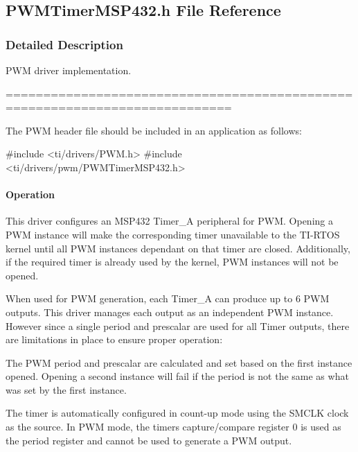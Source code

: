 \subsection{P\+W\+M\+Timer\+M\+S\+P432.\+h File Reference}
\label{_p_w_m_timer_m_s_p432_8h}


\subsubsection{Detailed Description}
P\+W\+M driver implementation. 

============================================================================

The P\+W\+M header file should be included in an application as follows\+: 
\begin{DoxyCode}
\textcolor{preprocessor}{#include <ti/drivers/PWM.h>}
\textcolor{preprocessor}{#include <ti/drivers/pwm/PWMTimerMSP432.h>}
\end{DoxyCode}


\paragraph*{Operation}

This driver configures an M\+S\+P432 Timer\+\_\+\+A peripheral for P\+W\+M. Opening a P\+W\+M instance will make the corresponding timer unavailable to the T\+I-\/\+R\+T\+O\+S kernel until all P\+W\+M instances dependant on that timer are closed. Additionally, if the required timer is already used by the kernel, P\+W\+M instances will not be opened.

When used for P\+W\+M generation, each Timer\+\_\+\+A can produce up to 6 P\+W\+M outputs. This driver manages each output as an independent P\+W\+M instance. However since a single period and prescalar are used for all Timer outputs, there are limitations in place to ensure proper operation\+:
\begin{DoxyEnumerate}
\item The P\+W\+M period and prescalar are calculated and set based on the first instance opened. Opening a second instance will fail if the period is not the same as what was set by the first instance.
\end{DoxyEnumerate}

The timer is automatically configured in count-\/up mode using the S\+M\+C\+L\+K clock as the source. In P\+W\+M mode, the timers capture/compare register 0 is used as the period register and cannot be used to generate a P\+W\+M output.

